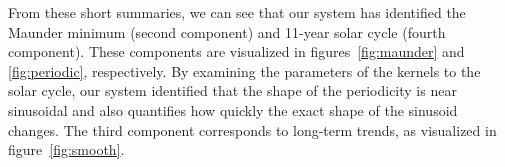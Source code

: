 \documentclass[letterpaper]{article}
\begin{document}
From these short summaries, we can see that our system has identified the Maunder minimum (second component) and 11-year solar cycle (fourth component). These components are visualized in figures~\ref{fig:maunder} and \ref{fig:periodic}, respectively. 
By examining the parameters of the kernels to the solar cycle, our system identified that the shape of the periodicity is near sinusoidal and also quantifies how quickly the exact shape of the sinusoid changes.
The third component corresponds to long-term trends, as visualized in figure~\ref{fig:smooth}.

%
%
%
%
\end{document}
